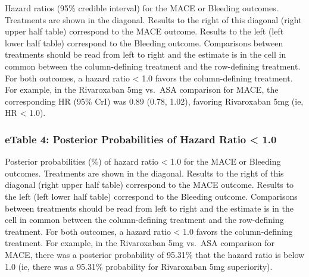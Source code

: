 \documentclass[
  12pt,
]{article}
\begin{document}
\begin{landscape}
Hazard ratios (95\% credible interval) for the MACE or Bleeding
outcomes. Treatments are shown in the diagonal. Results to the right of
this diagonal (right upper half table) correspond to the MACE outcome.
Results to the left (left lower half table) correspond to the Bleeding
outcome. Comparisons between treatments should be read from left to
right and the estimate is in the cell in common between the
column-defining treatment and the row-defining treatment. For both
outcomes, a hazard ratio \textless{} 1.0 favors the column-defining
treatment. For example, in the Rivaroxaban 5mg vs.~ASA comparison for
MACE, the corresponding HR (95\% CrI) was 0.89 (0.78, 1.02), favoring
Rivaroxaban 5mg (ie, HR \textless{} 1.0).

\newpage

\hypertarget{etable-4-posterior-probabilities-of-hazard-ratio-1.0}{%
\subsubsection{eTable 4: Posterior Probabilities of Hazard Ratio
\textless{}
1.0}\label{etable-4-posterior-probabilities-of-hazard-ratio-1.0}}

\begin{table}[!h]
\centering
{}
\end{table}

Posterior probabilities (\%) of hazard ratio \textless{} 1.0 for the
MACE or Bleeding outcomes. Treatments are shown in the diagonal. Results
to the right of this diagonal (right upper half table) correspond to the
MACE outcome. Results to the left (left lower half table) correspond to
the Bleeding outcome. Comparisons between treatments should be read from
left to right and the estimate is in the cell in common between the
column-defining treatment and the row-defining treatment. For both
outcomes, a hazard ratio \textless{} 1.0 favors the column-defining
treatment. For example, in the Rivaroxaban 5mg vs.~ASA comparison for
MACE, there was a posterior probability of 95.31\% that the hazard ratio
is below 1.0 (ie, there was a 95.31\% probability for Rivaroxaban 5mg
superiority).


\end{landscape}
\end{document}
